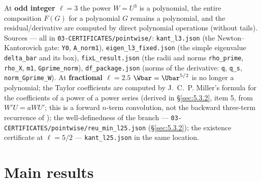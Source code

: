 At \textbf{odd integer $\ell=3$} the power $W = U^3$ is a polynomial, the entire composition $F(G)$
for a polynomial $G$ remains a polynomial, and the residual/derivative are computed by
direct polynomial operations (without tails). Sources --- all in
\texttt{03-\allowbreak CERTIFICATES/\allowbreak pointwise/\allowbreak }: \texttt{kant\_l3.json} (the Newton--Kantorovich gate: \texttt{Y0},
\texttt{A\_norm1}), \texttt{eigen\_\allowbreak l3\_\allowbreak fixed.json} (the simple eigenvalue \texttt{delta\_bar} and its box),
\texttt{fixL\_\allowbreak result.json} (the radii and norms \texttt{rho\_prime}, \texttt{rho\_X}, \texttt{m1}, \texttt{Gprime\_norm}),
\texttt{df\_\allowbreak package.json} (norms of the derivative: \texttt{q}, \texttt{q\_s}, \texttt{norm\_\allowbreak Gprime\_\allowbreak W}). At
\textbf{fractional $\ell=2.5$} $\Wbar = \Ubar^{5/2}$ is no longer a polynomial; the Taylor coefficients
are computed by J.~C.~P. Miller's formula for the coefficients of a power of a
power series \cite[\S4.7]{knuth1997taocp2} (derived in \S\ref{sec:5.3.2}, item 5,
from $W'U = aWU'$; this is a forward $n$-term convolution, not the backward
three-term recurrence of \cite{gautschi1967computational}); the well-definedness of the branch ---
\texttt{03-\allowbreak CERTIFICATES/\allowbreak pointwise/\allowbreak reu\_\allowbreak min\_\allowbreak l25.json} (\S\ref{sec:5.3.2}); the existence certificate at
$\ell = 5/2$ --- \texttt{kant\_\allowbreak l25.json} in the same location.


\section{Main results}
\label{sec:2}

